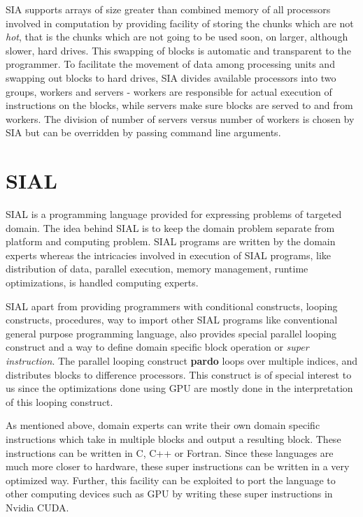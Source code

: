 SIA supports arrays of size greater than combined memory of all processors
involved in computation by providing facility of storing the chunks which are
not \textit{hot}, that is the chunks which are not going to be used soon, on
larger, although slower, hard drives. This swapping of blocks is automatic
and transparent to the programmer. To facilitate the movement of data among
processing units and swapping out blocks to hard drives, SIA divides available
processors into two groups, workers and servers - workers are responsible for
actual execution of instructions on the blocks, while servers make sure blocks
are served to and from workers. The division of number of servers versus number
of workers is chosen by SIA but can be overridden by passing command line
arguments.

\section{SIAL}
SIAL is a programming language provided for expressing problems of targeted
domain. The idea behind SIAL is to keep the domain problem separate from
platform and computing problem. SIAL programs are written by the domain experts
whereas the intricacies involved in execution of SIAL programs, like distribution of
data, parallel execution, memory management, runtime optimizations, is handled
computing experts.

SIAL apart from providing programmers with conditional constructs, looping constructs,
procedures, way to import other SIAL programs like conventional general purpose
programming language, also provides special parallel looping construct and a way
to define domain specific block operation or \textit{super instruction}. The
parallel looping construct \textbf{pardo} loops over multiple indices, and
distributes blocks to difference processors. This construct is of special
interest to us since the optimizations done using GPU are mostly done in the
interpretation of this looping construct.

As mentioned above, domain experts can write their own domain specific
instructions which take in multiple blocks and output a resulting block. These
instructions can be written in C, C++ or Fortran. Since these languages are much
more closer to hardware, these super instructions can be written in a very
optimized way. Further, this facility can be exploited to port the language to
other computing devices such as GPU by writing these super instructions in
Nvidia CUDA.

